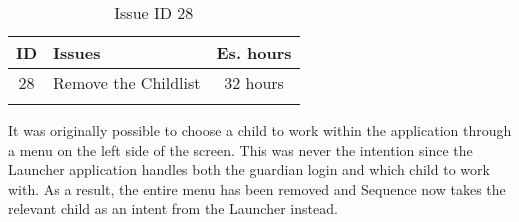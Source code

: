 \begin{longtable} { | c | p{12cm} | c | } 
\hline
	ID 	&	Issues	&		 Es. hours \\\hline
	28 	&	Remove the Childlist	&	32 hours \\\hline
\caption{Issue ID 28}
\label{tab:spr2_removechildlist}
\end{longtable}

It was originally possible to choose a child to work within the application through a menu on the left side of the screen. This was never the intention since the Launcher application handles both the guardian login and which child to work with. As a result, the entire menu has been removed and Sequence now takes the relevant child as an intent from the Launcher instead. 